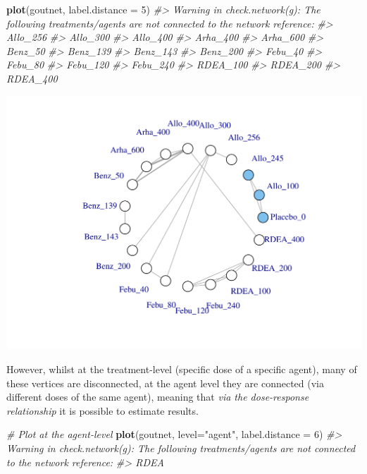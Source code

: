 \documentclass[]{article}
\newenvironment{Shaded}{\begin{snugshade}}{\end{snugshade}}
\newcommand{\CommentTok}[1]{\textcolor[rgb]{0.56,0.35,0.01}{\textit{#1}}}
\newcommand{\DataTypeTok}[1]{\textcolor[rgb]{0.13,0.29,0.53}{#1}}
\newcommand{\DecValTok}[1]{\textcolor[rgb]{0.00,0.00,0.81}{#1}}
\newcommand{\KeywordTok}[1]{\textcolor[rgb]{0.13,0.29,0.53}{\textbf{#1}}}
\newcommand{\NormalTok}[1]{#1}
\newcommand{\StringTok}[1]{\textcolor[rgb]{0.31,0.60,0.02}{#1}}
\begin{document}
\begin{Shaded}
\begin{Highlighting}[]
\KeywordTok{plot}\NormalTok{(goutnet, }\DataTypeTok{label.distance =} \DecValTok{5}\NormalTok{)}
\CommentTok{#> Warning in check.network(g): The following treatments/agents are not connected to the network reference:}
\CommentTok{#> Allo_256}
\CommentTok{#> Allo_300}
\CommentTok{#> Allo_400}
\CommentTok{#> Arha_400}
\CommentTok{#> Arha_600}
\CommentTok{#> Benz_50}
\CommentTok{#> Benz_139}
\CommentTok{#> Benz_143}
\CommentTok{#> Benz_200}
\CommentTok{#> Febu_40}
\CommentTok{#> Febu_80}
\CommentTok{#> Febu_120}
\CommentTok{#> Febu_240}
\CommentTok{#> RDEA_100}
\CommentTok{#> RDEA_200}
\CommentTok{#> RDEA_400}
\end{Highlighting}
\end{Shaded}

\includegraphics{mbnmadose_files/figure-latex/unnamed-chunk-8-1.pdf}

However, whilst at the treatment-level (specific dose of a specific
agent), many of these vertices are disconnected, at the agent level they
are connected (via different doses of the same agent), meaning that
\emph{via the dose-response relationship} it is possible to estimate
results.

\begin{Shaded}
\begin{Highlighting}[]
\CommentTok{# Plot at the agent-level}
\KeywordTok{plot}\NormalTok{(goutnet, }\DataTypeTok{level=}\StringTok{"agent"}\NormalTok{, }\DataTypeTok{label.distance =} \DecValTok{6}\NormalTok{)}
\CommentTok{#> Warning in check.network(g): The following treatments/agents are not connected to the network reference:}
\CommentTok{#> RDEA}
\end{Highlighting}
\end{Shaded}
\end{document}
